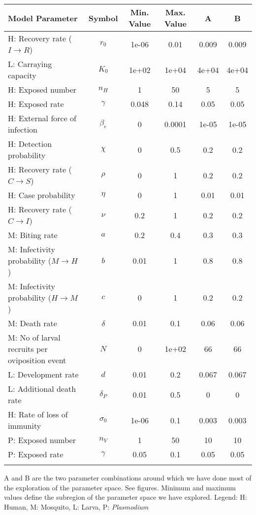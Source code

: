 \begin{table}
\noindent
\begin{tabular}{p{5cm}ccccc}
{\bf Model Parameter} & {\bf Symbol} & {\bf Min. Value} & {\bf Max. Value} & {\bf A} & {\bf B}\\
\hline\hline
  H: Recovery rate ($I \rightarrow R$) & $r_0$ & 1e-06 & 0.01 & 0.009 & 0.009\\
  L: Carraying capacity & $K_0$ & 1e+02 & 1e+04 & 4e+04 & 4e+04\\
  H: Exposed number & $n_H$ &    1 &   50 &    5 &    5\\
  H: Exposed rate & $\gamma$ & 0.048 & 0.14 & 0.05 & 0.05\\
  H: External force of infection & $\beta_e$ &    0 & 0.0001 & 1e-05 & 1e-05\\
  H: Detection probability & $\chi$ &    0 &  0.5 &  0.2 &  0.2\\
  H: Recovery rate ($C \rightarrow S$) & $\rho$ &    0 &    1 &  0.2 &  0.2\\
  H: Case probability & $\eta$ &    0 &    1 & 0.01 & 0.01\\
  H: Recovery rate ($C \rightarrow I$) & $\nu$ &  0.2 &    1 &  0.2 &  0.2\\
  M: Biting rate & $a$ &  0.2 &  0.4 &  0.3 &  0.3\\
  M: Infectivity probability ($M \rightarrow H$) & $b$ & 0.01 &    1 &  0.8 &  0.8\\
  M: Infectivity probability ($H \rightarrow M$) & $c$ &    0 &    1 &  0.2 &  0.2\\
  M: Death rate & $\delta$ & 0.01 &  0.1 & 0.06 & 0.06\\
  M: No of larval recruits per oviposition event & $N$ &    0 & 1e+02 &   66 &   66\\
  L: Development rate & $d$ & 0.01 &  0.2 & 0.067 & 0.067\\
  L: Additional death rate & $\delta_P$ & 0.01 &  0.5 &    0 &    0\\
  H: Rate of loss of immunity & $\sigma_0$ & 1e-06 &  0.1 & 0.003 & 0.003\\
  P: Exposed number & $n_V$ &    1 &   50 &   10 &   10\\
  P: Exposed rate & $\gamma$ & 0.05 &  0.1 & 0.05 & 0.05\\
\hline\hline
\smallskip
\end{tabular}
 A and B are the two parameter combinations around which we have done most of the exploration of the parameter space. See figures. Minimum and maximum values define the subregion of the parameter space we have explored. Legend: {\small H: Human, M: Mosquito, L: Larva, P: {\em Plasmodium}} 
\end{table}
